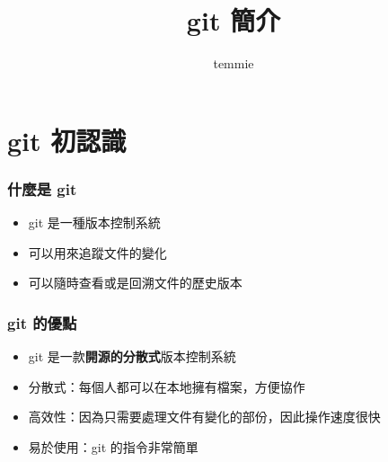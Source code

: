 \documentclass[mathserif]{beamer}
\title{git 簡介}
\author{temmie}
\date{}
\begin{document}
\begin{frame}
    \titlepage
\end{frame}

\begin{frame}
    \tableofcontents
\end{frame}

\section{git 初認識}

\begin{frame}
    \frametitle{什麼是 git}
    \begin{itemize}
        \item git 是一種版本控制系統
        \item 可以用來追蹤文件的變化
        \item 可以隨時查看或是回溯文件的歷史版本
    \end{itemize}
\end{frame}

\begin{frame}
    \frametitle{git 的優點}
    \begin{itemize}
        \item git 是一款\textbf{開源的分散式}版本控制系統
        \vspace{0.5cm}
        \item<2-> 分散式：每個人都可以在本地擁有檔案，方便協作
        \item<3-> 高效性：因為只需要處理文件有變化的部份，因此操作速度很快
        \item<4-> 易於使用：git 的指令非常簡單
    \end{itemize}
\end{frame}
\end{document}
